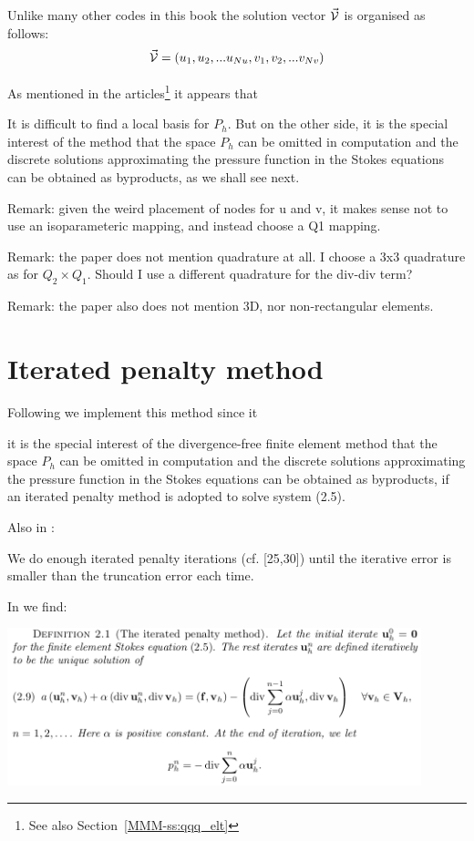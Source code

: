 Unlike many other codes in this book the solution vector $\vec{\cal V}$ 
is organised as follows:
\[
\vec{\cal V} = ( u_1, u_2, ... u_{Nu}, v_1, v_2, ... v_{Nv})
\]

As mentioned in the articles\footnote{See also Section~\ref{MMM-ss:qqq_elt}} 
it appears that 
\begin{displayquote}
{\color{darkgray}
It is difficult to ﬁnd a
local basis for $P_h$. But on the other side, it is the special interest of the method that
the space $P_h$ can be omitted in computation and the discrete solutions approximating
the pressure function in the Stokes equations can be obtained as byproducts, as we
shall see next.}
\end{displayquote}


Remark: given the weird placement of nodes for u and v, it makes sense not to 
use an isoparameteric mapping, and instead choose a Q1 mapping.

Remark: the paper does not mention quadrature at all. 
I choose a 3x3 quadrature as for $Q_2\times Q_1$. 
Should I use a different quadrature for the div-div term?

Remark: the paper also does not mention 3D, nor non-rectangular elements. 

\section*{Iterated penalty method}

Following \cite{zhan09,huzh11} we implement this method since it 

\begin{displayquote}
{\color{darkgray}
it is the special interest
of the divergence-free ﬁnite element method that the space $P_h$ can be omitted
in computation and the discrete solutions approximating the pressure function
in the Stokes equations can be obtained as byproducts, if an iterated penalty
method is adopted to solve system (2.5).}
\end{displayquote}

Also in \cite{huzh11}:
\begin{displayquote}
{\color{darkgray}
We do enough iterated penalty iterations (cf. [25,30]) until the iterative error is smaller
than the truncation error each time.}
\end{displayquote}

In \cite{zhan09} we find:
\begin{center}
\includegraphics[width=12cm]{python_codes/fieldstone_161/images/iterpen}
\end{center}

